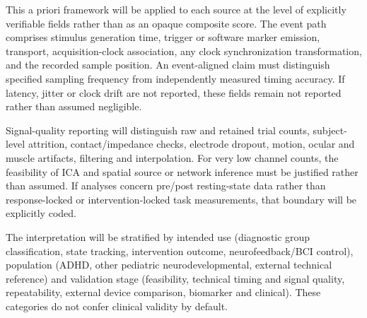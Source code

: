 This a priori framework will be applied to each source at the level of explicitly verifiable fields rather than as an opaque composite score. The event path comprises stimulus generation time, trigger or software marker emission, transport, acquisition-clock association, any clock synchronization transformation, and the recorded sample position. An event-aligned claim must distinguish specified sampling frequency from independently measured timing accuracy. If latency, jitter or clock drift are not reported, these fields remain not reported rather than assumed negligible.

Signal-quality reporting will distinguish raw and retained trial counts, subject-level attrition, contact/impedance checks, electrode dropout, motion, ocular and muscle artifacts, filtering and interpolation. For very low channel counts, the feasibility of ICA and spatial source or network inference must be justified rather than assumed. If analyses concern pre/post resting-state data rather than response-locked or intervention-locked task measurements, that boundary will be explicitly coded.

The interpretation will be stratified by intended use (diagnostic group classification, state tracking, intervention outcome, neurofeedback/BCI control), population (ADHD, other pediatric neurodevelopmental, external technical reference) and validation stage (feasibility, technical timing and signal quality, repeatability, external device comparison, biomarker and clinical). These categories do not confer clinical validity by default.
